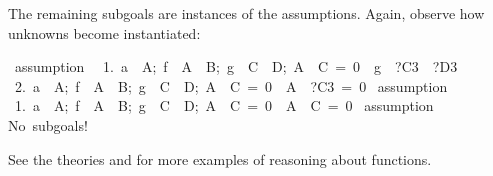The remaining subgoals are instances of the assumptions.  Again, observe how
unknowns become instantiated:
\begin{isabelle}
\ assumption\ \isanewline
\ 1.\ \isasymlbrakk a\ \isasymin \ A;\ f\ \isasymin \ A\ \isasymrightarrow \ B;\ g\ \isasymin \ C\ \isasymrightarrow \ D;\ A\ \isasyminter \ C\ =\ 0\isasymrbrakk \ \isasymLongrightarrow \ g\ \isasymin \ ?C3\ \isasymrightarrow \ ?D3\isanewline
\ 2.\ \isasymlbrakk a\ \isasymin \ A;\ f\ \isasymin \ A\ \isasymrightarrow \ B;\ g\ \isasymin \ C\ \isasymrightarrow \ D;\ A\ \isasyminter \ C\ =\ 0\isasymrbrakk \ \isasymLongrightarrow \ A\ \isasyminter \ ?C3\ =\ 0
\isanewline
{}\ assumption\ \isanewline
\ 1.\ \isasymlbrakk a\ \isasymin \ A;\ f\ \isasymin \ A\ \isasymrightarrow \ B;\ g\ \isasymin \ C\ \isasymrightarrow \ D;\ A\ \isasyminter \ C\ =\ 0\isasymrbrakk \ \isasymLongrightarrow \ A\ \isasyminter \ C\ =\ 0
\isanewline
{}\ assumption\ \isanewline
No\ subgoals!\isanewline
{}
\end{isabelle}
See the theories  and  for more
examples of reasoning about functions.

